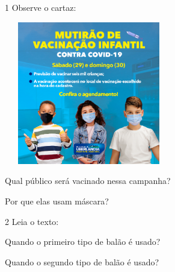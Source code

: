
\num{1} Observe o cartaz:

\includegraphics[width=2.89864in,height=2.45070in]{media/image128.png}


\begin{escolha}
\item Qual público será vacinado nessa campanha?


\item Por que elas usam máscara?

\end{escolha}

\num{2} Leia o texto:




\begin{escolha}
\item Quando o primeiro tipo de balão é usado?


\item Quando o segundo tipo de balão é usado?

\end{escolha}

